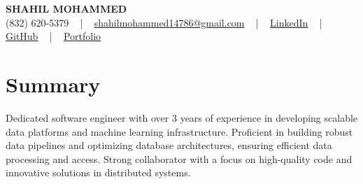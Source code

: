 \documentclass[letterpaper,10pt]{article}
\begin{document}
\begin{center}
    {\fontsize{14pt}{12pt}\selectfont \textbf{\MakeUppercase{Shahil Mohammed}}}\\ \vspace{2pt}
    \fontsize{10pt}{12pt}\selectfont (832) 620-5379 ~ | ~ \href{mailto:shahilmohammed14786@gmail.com}{shahilmohammed14786@gmail.com} ~ | ~  
    \href{https://www.linkedin.com/in/shahil-mohammed-9652931a1/}{\color{blue}\underline{LinkedIn}}  ~ | ~ 
    \href{https://github.com/freakbeast14}{\color{blue}\underline{GitHub}} ~ | ~ 
    \href{https://shahil-mohammed.netlify.app/}{\color{blue}\underline{Portfolio}}
    \vspace{-8pt}
\end{center}

\section{Summary}
\vspace{-2pt}\fontsize{8pt}{9pt}\selectfont
Dedicated software engineer with over 3 years of experience in developing scalable data platforms and machine learning infrastructure. Proficient in building robust data pipelines and optimizing database architectures, ensuring efficient data processing and access. Strong collaborator with a focus on high-quality code and innovative solutions in distributed systems.

\vspace{-5pt}

\vspace{-2pt}
\end{document}
